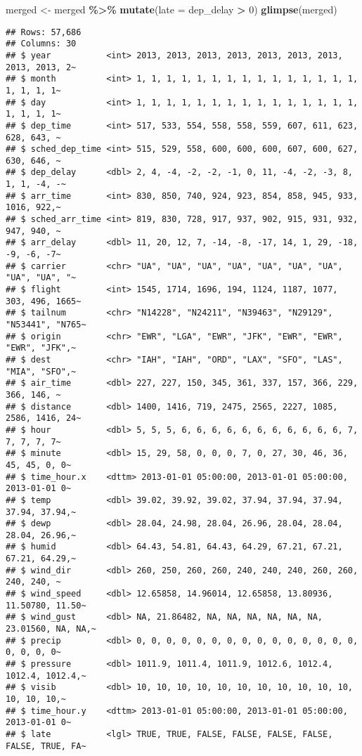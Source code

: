 \documentclass[
]{article}
\newenvironment{Shaded}{\begin{snugshade}}{\end{snugshade}}
\newcommand{\AttributeTok}[1]{\textcolor[rgb]{0.13,0.29,0.53}{#1}}
\newcommand{\DecValTok}[1]{\textcolor[rgb]{0.00,0.00,0.81}{#1}}
\newcommand{\FunctionTok}[1]{\textcolor[rgb]{0.13,0.29,0.53}{\textbf{#1}}}
\newcommand{\NormalTok}[1]{#1}
\newcommand{\OtherTok}[1]{\textcolor[rgb]{0.56,0.35,0.01}{#1}}
\newcommand{\SpecialCharTok}[1]{\textcolor[rgb]{0.81,0.36,0.00}{\textbf{#1}}}
\begin{document}
\begin{Shaded}
\begin{Highlighting}[]
\NormalTok{merged }\OtherTok{\textless{}{-}}\NormalTok{ merged }\SpecialCharTok{\%\textgreater{}\%}
  \FunctionTok{mutate}\NormalTok{(}\AttributeTok{late =}\NormalTok{ dep\_delay }\SpecialCharTok{\textgreater{}} \DecValTok{0}\NormalTok{)}
\FunctionTok{glimpse}\NormalTok{(merged)}
\end{Highlighting}
\end{Shaded}

\begin{verbatim}
## Rows: 57,686
## Columns: 30
## $ year           <int> 2013, 2013, 2013, 2013, 2013, 2013, 2013, 2013, 2013, 2~
## $ month          <int> 1, 1, 1, 1, 1, 1, 1, 1, 1, 1, 1, 1, 1, 1, 1, 1, 1, 1, 1~
## $ day            <int> 1, 1, 1, 1, 1, 1, 1, 1, 1, 1, 1, 1, 1, 1, 1, 1, 1, 1, 1~
## $ dep_time       <int> 517, 533, 554, 558, 558, 559, 607, 611, 623, 628, 643, ~
## $ sched_dep_time <int> 515, 529, 558, 600, 600, 600, 607, 600, 627, 630, 646, ~
## $ dep_delay      <dbl> 2, 4, -4, -2, -2, -1, 0, 11, -4, -2, -3, 8, 1, 1, -4, -~
## $ arr_time       <int> 830, 850, 740, 924, 923, 854, 858, 945, 933, 1016, 922,~
## $ sched_arr_time <int> 819, 830, 728, 917, 937, 902, 915, 931, 932, 947, 940, ~
## $ arr_delay      <dbl> 11, 20, 12, 7, -14, -8, -17, 14, 1, 29, -18, -9, -6, -7~
## $ carrier        <chr> "UA", "UA", "UA", "UA", "UA", "UA", "UA", "UA", "UA", "~
## $ flight         <int> 1545, 1714, 1696, 194, 1124, 1187, 1077, 303, 496, 1665~
## $ tailnum        <chr> "N14228", "N24211", "N39463", "N29129", "N53441", "N765~
## $ origin         <chr> "EWR", "LGA", "EWR", "JFK", "EWR", "EWR", "EWR", "JFK",~
## $ dest           <chr> "IAH", "IAH", "ORD", "LAX", "SFO", "LAS", "MIA", "SFO",~
## $ air_time       <dbl> 227, 227, 150, 345, 361, 337, 157, 366, 229, 366, 146, ~
## $ distance       <dbl> 1400, 1416, 719, 2475, 2565, 2227, 1085, 2586, 1416, 24~
## $ hour           <dbl> 5, 5, 5, 6, 6, 6, 6, 6, 6, 6, 6, 6, 6, 6, 7, 7, 7, 7, 7~
## $ minute         <dbl> 15, 29, 58, 0, 0, 0, 7, 0, 27, 30, 46, 36, 45, 45, 0, 0~
## $ time_hour.x    <dttm> 2013-01-01 05:00:00, 2013-01-01 05:00:00, 2013-01-01 0~
## $ temp           <dbl> 39.02, 39.92, 39.02, 37.94, 37.94, 37.94, 37.94, 37.94,~
## $ dewp           <dbl> 28.04, 24.98, 28.04, 26.96, 28.04, 28.04, 28.04, 26.96,~
## $ humid          <dbl> 64.43, 54.81, 64.43, 64.29, 67.21, 67.21, 67.21, 64.29,~
## $ wind_dir       <dbl> 260, 250, 260, 260, 240, 240, 240, 260, 260, 240, 240, ~
## $ wind_speed     <dbl> 12.65858, 14.96014, 12.65858, 13.80936, 11.50780, 11.50~
## $ wind_gust      <dbl> NA, 21.86482, NA, NA, NA, NA, NA, NA, 23.01560, NA, NA,~
## $ precip         <dbl> 0, 0, 0, 0, 0, 0, 0, 0, 0, 0, 0, 0, 0, 0, 0, 0, 0, 0, 0~
## $ pressure       <dbl> 1011.9, 1011.4, 1011.9, 1012.6, 1012.4, 1012.4, 1012.4,~
## $ visib          <dbl> 10, 10, 10, 10, 10, 10, 10, 10, 10, 10, 10, 10, 10, 10,~
## $ time_hour.y    <dttm> 2013-01-01 05:00:00, 2013-01-01 05:00:00, 2013-01-01 0~
## $ late           <lgl> TRUE, TRUE, FALSE, FALSE, FALSE, FALSE, FALSE, TRUE, FA~
\end{verbatim}
\end{document}
